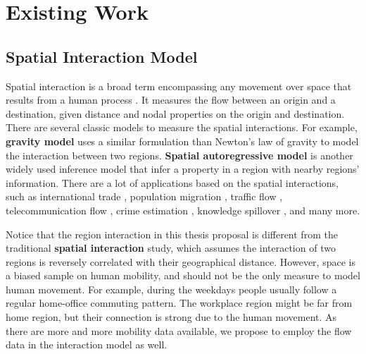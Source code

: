 \section{Existing Work}
\label{sec:ew}



\subsection{Spatial Interaction Model}


Spatial interaction is a broad term encompassing any movement over space that results from a human process \cite{haynes1984gravity,rodrigue2013geography}. It measures the flow between an origin and a destination, given distance and nodal properties on the origin and destination.  There are several classic models to measure the spatial interactions. For example, \textbf{gravity model} \cite{matyas1997proper} uses a similar formulation than Newton's law of gravity to model the interaction between two regions.
\textbf{Spatial autoregressive model} \cite{anselin1980estimation} is another widely used inference model that infer a property in a region with nearby regions' information. There are a lot of  applications  based on the spatial interactions, such as international trade \cite{carrere2006revisiting, egger2003proper, martinez2003augmented}, population migration \cite{hanski1994metapopulation, karemera2000gravity, lewer2008gravity}, traffic flow \cite{jung2008gravity, roughan2002experience, khadaroo2008role}, telecommunication flow \cite{krings2009urban, fischer1994artificial, black1995spatial}, crime estimation \cite{anselin2000spatial, kakamu2008spatial, browning2004paradox}, knowledge spillover \cite{lesage2007knowledge, fischer2006geography}, and many more.



Notice that the region interaction in this thesis proposal is different from the traditional \textbf{spatial interaction} study, which assumes the interaction of two regions is reversely correlated with their geographical distance. However, space is a biased sample on human mobility, and should not be the only measure to model human movement. For example, during the weekdays people usually follow a regular home-office commuting pattern. The workplace region might be far from home region, but their connection is strong due to the human movement. As there are more and more mobility data available, we propose to employ the flow data in the interaction model as well.







